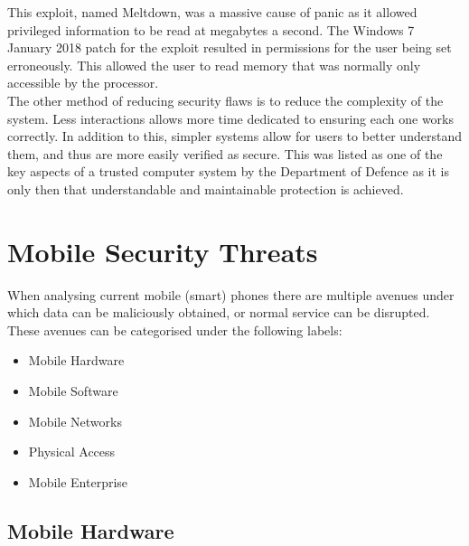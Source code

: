 This exploit, named Meltdown, was a massive cause of panic as it allowed privileged information to be read at megabytes a second.
The Windows 7 January 2018 patch for the exploit resulted in permissions for the user being set erroneously.
This allowed the user to read memory that was normally only accessible by the processor.\cite{Reference9}\\
The other method of reducing security flaws is to reduce the complexity of the system.
Less interactions allows more time dedicated to ensuring each one works correctly.
In addition to this, simpler systems allow for users to better understand them, and thus are more easily verified as secure.
This was listed as one of the key aspects of a trusted computer system by the Department of Defence as it is only then that understandable and maintainable protection is achieved.\cite{Reference10}


\section{Mobile Security Threats}

\label{Ch2 Sec2}

When analysing current mobile (smart) phones there are multiple avenues under which data can be maliciously obtained, or normal service can be disrupted.
These avenues can be categorised under the following labels:
\begin{itemize} 
\item Mobile Hardware
\item Mobile Software
\item Mobile Networks
\item Physical Access
\item Mobile Enterprise 
\end{itemize}


\subsection{Mobile Hardware}

\label{Ch2 Sec2 Sub1}

